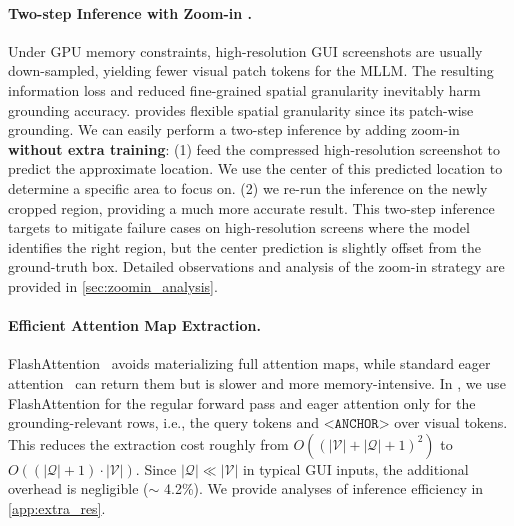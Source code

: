 \paragraph{Two-step Inference with Zoom-in \faSearchPlus.} \label{sec:zoom}
Under GPU memory constraints, high-resolution GUI screenshots are usually down-sampled, yielding fewer visual patch tokens for the MLLM. The resulting information loss and reduced fine-grained spatial granularity inevitably harm grounding accuracy. 
\method{} provides flexible spatial granularity since its patch-wise grounding. We can easily perform a two-step inference by adding zoom-in \textbf{without extra training}: (1) feed the compressed high-resolution screenshot to predict the approximate location. We use the center of this predicted location to determine a specific area to focus on. (2) we re-run the inference on the newly cropped region, providing a much more accurate result. 
This two-step inference targets to mitigate failure cases on high-resolution screens where the model identifies the right region, but the center prediction is slightly offset from the ground-truth box. Detailed observations and analysis of the zoom-in strategy are provided in \cref{sec:zoomin_analysis}.

\paragraph{Efficient Attention Map Extraction.}
FlashAttention~\citep{dao2022flashattention} avoids materializing full attention maps, while standard eager attention~\citep{vaswani2017attention} can return them but is slower and more memory-intensive. In \method{}, we use FlashAttention for the regular forward pass and eager attention only for the grounding-relevant rows, i.e., the query tokens and $\texttt{<ANCHOR>}$ over visual tokens. This reduces the extraction cost roughly from $O((|\mathcal{V}|+|\mathcal{Q}|+1)^2)$ to $O((|\mathcal{Q}|+1)\cdot|\mathcal{V}|)$. Since $|\mathcal{Q}|\ll |\mathcal{V}|$ in typical GUI inputs, the additional overhead is negligible ($\sim$ 4.2\%). We provide analyses of inference efficiency in \cref{app:extra_res}.